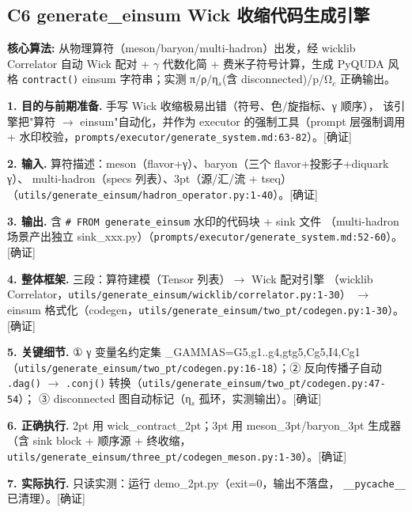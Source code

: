 \documentclass[UTF8]{ctexart}
\begin{document}
\subsection{C6 generate\_einsum Wick 收缩代码生成引擎}

\begin{algobox}
\textbf{核心算法:} 从物理算符（meson/baryon/multi-hadron）出发，经 wicklib Correlator
自动 Wick 配对 + $\gamma$ 代数化简 + 费米子符号计算，生成 PyQUDA 风格
\texttt{contract()} einsum 字符串；实测 π/ρ/η$_s$(含 disconnected)/p/Ω$_c$ 正确输出。
\end{algobox}

\noindent\textbf{1. 目的与前期准备.} 手写 Wick 收缩极易出错（符号、色/旋指标、γ 顺序），
该引擎把"算符 $\rightarrow$ einsum"自动化，并作为 executor 的强制工具（prompt 层强制调用 +
水印校验，\texttt{\nolinkurl{prompts/executor/generate_system.md:63-82}}）。[确证]

\noindent\textbf{2. 输入.} 算符描述：meson（flavor+γ）、baryon（三个 flavor+投影子+diquark γ）、
multi-hadron（specs 列表）、3pt（源/汇/流 + tseq）（\texttt{\nolinkurl{utils/generate_einsum/hadron_operator.py:1-40}}）。[确证]

\noindent\textbf{3. 输出.} 含 \texttt{\# FROM generate\_einsum} 水印的代码块 + sink 文件
（multi-hadron 场景产出独立 sink\_xxx.py）（\texttt{\nolinkurl{prompts/executor/generate_system.md:52-60}}）。[确证]

\noindent\textbf{4. 整体框架.} 三段：算符建模（Tensor 列表）$\rightarrow$ Wick 配对引擎
（wicklib Correlator，\texttt{\nolinkurl{utils/generate_einsum/wicklib/correlator.py:1-30}}）
$\rightarrow$ einsum 格式化（codegen，\texttt{\nolinkurl{utils/generate_einsum/two_pt/codegen.py:1-30}}）。[确证]

\noindent\textbf{5. 关键细节.} ① γ 变量名约定集 \_GAMMAS={G5,g1..g4,gtg5,Cg5,I4,Cg1}
（\texttt{\nolinkurl{utils/generate_einsum/two_pt/codegen.py:16-18}}）；② 反向传播子自动
\texttt{.dag()} $\rightarrow$ \texttt{.conj()} 转换（\texttt{\nolinkurl{utils/generate_einsum/two_pt/codegen.py:47-54}}）；
③ disconnected 图自动标记（η$_s$ 孤环，实测输出）。[确证]

\noindent\textbf{6. 正确执行.} 2pt 用 wick\_contract\_2pt；3pt 用 meson\_3pt/baryon\_3pt 生成器
（含 sink block + 顺序源 + 终收缩，\texttt{\nolinkurl{utils/generate_einsum/three_pt/codegen_meson.py:1-30}}）。[确证]

\noindent\textbf{7. 实际执行.} \textcolor{algo}{只读实测}：运行 demo\_2pt.py（exit=0，输出不落盘，
\texttt{\_\_pycache\_\_} 已清理）。[确证]
\end{document}
